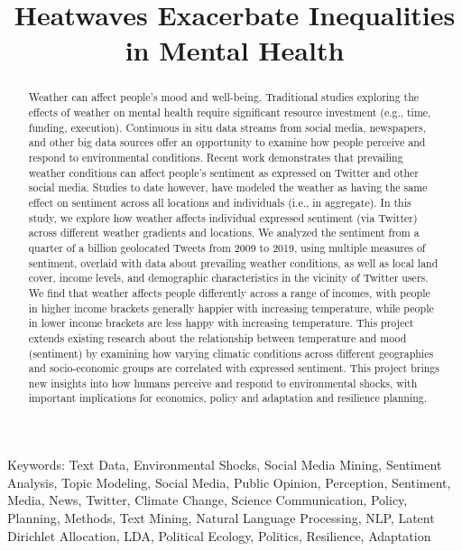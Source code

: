 \documentclass{article}
\begin{document}
\title{Heatwaves Exacerbate Inequalities in Mental Health}



\maketitle

\begin{abstract}
Weather can affect people’s mood and well-being. Traditional studies exploring the effects of weather on mental health require significant resource investment (e.g., time, funding, execution).  Continuous in situ data streams from social media, newspapers, and other big data sources offer an opportunity to examine how people perceive and respond to environmental conditions. Recent work demonstrates that prevailing weather conditions can affect people’s sentiment as expressed on Twitter and other social media.  Studies to date however, have modeled the weather as having the same effect on sentiment across all locations and individuals (i.e., in aggregate).  In this study, we explore how weather affects individual expressed sentiment (via Twitter) across different weather gradients and locations. We analyzed the sentiment from a quarter of a billion geolocated Tweets from 2009 to 2019, using multiple measures of sentiment, overlaid with data about prevailing weather conditions, as well as local land cover, income levels, and demographic characteristics in the vicinity of Twitter users.  We find that weather affects people differently across a range of incomes, with people in higher income brackets generally happier with increasing temperature, while people in lower income brackets are less happy with increasing temperature.  This project extends existing research about the relationship between temperature and mood (sentiment) by examining how varying climatic conditions across different geographies and socio-economic groups are correlated with expressed sentiment. This project brings new insights into how humans perceive and respond to environmental shocks, with important implications for economics, policy and adaptation and resilience planning.

\end{abstract}

Keywords: Text Data, Environmental Shocks, Social Media Mining, Sentiment Analysis, Topic Modeling, Social Media, Public Opinion, Perception, Sentiment, Media, News, Twitter, Climate Change, Science Communication, Policy, Planning, Methods, Text Mining, Natural Language Processing, NLP, Latent Dirichlet Allocation, LDA, Political Ecology, Politics, Resilience, Adaptation
\end{document}
